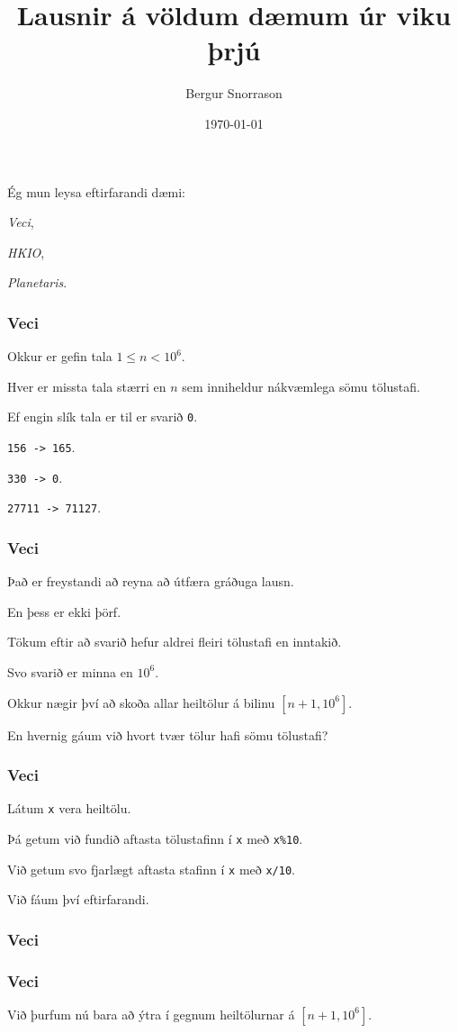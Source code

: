 \title{Lausnir á völdum dæmum úr viku þrjú}
\author{Bergur Snorrason}
\date{\today}



\frame{\titlepage}

{
	{
		\item<1-> Ég mun leysa eftirfarandi dæmi:
		{
			\item<2-> \emph{Veci},
			\item<3-> \emph{HKIO},
			\item<4-> \emph{Planetaris}.
		}
	}
}

{
	\frametitle{Veci}
	{
		\item<1-> Okkur er gefin tala $1 \leq n < 10^6$.
		\item<2-> Hver er missta tala stærri en $n$ sem inniheldur nákvæmlega sömu tölustafi.
		\item<3-> Ef engin slík tala er til er svarið \texttt{0}.
		\item<4-> \texttt{156 -> 165}.
		\item<5-> \texttt{330 -> 0}.
		\item<6-> \texttt{27711 -> 71127}.
	}
}

{
	\frametitle{Veci}
	{
		\item<1-> Það er freystandi að reyna að útfæra gráðuga lausn.
		\item<2-> En þess er ekki þörf.
		\item<3-> Tökum eftir að svarið hefur aldrei fleiri tölustafi en inntakið.
		\item<4-> Svo svarið er minna en $10^6$.
		\item<5-> Okkur nægir því að skoða allar heiltölur á bilinu $[n + 1, 10^6]$.
		\item<6-> En hvernig gáum við hvort tvær tölur hafi sömu tölustafi?
	}
}

{
	\frametitle{Veci}
	{
		\item<1-> Látum \texttt{x} vera heiltölu.
		\item<2-> Þá getum við fundið aftasta tölustafinn í \texttt{x} með \texttt{x\%10}.
		\item<3-> Við getum svo fjarlægt aftasta stafinn í \texttt{x} með \texttt{x/10}.
		\item<4-> Við fáum því eftirfarandi.
	}
}

{
	\frametitle{Veci}
}

{
	\frametitle{Veci}
	{
		\item<1-> Við þurfum nú bara að ýtra í gegnum heiltölurnar á $[n + 1, 10^6]$.
	}
}

